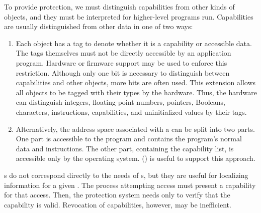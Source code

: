 To provide protection, we must distinguish capabilities from other kinds of objects, and they must be interpreted for higher-level programs run.
Capabilities are usually distinguished from other data in one of two ways:
\begin{enumerate}[noitemsep]
\item Each object has a tag to denote whether it is a capability or accessible data.
  The tags themselves must not be directly accessible by an application program.
  Hardware or firmware support may be used to enforce this restriction.
  Although only one bit is necessary to distinguish between capabilities and other objects, more bits are often used.
  This extension allows all objects to be tagged with their types by the hardware.
  Thus, the hardware can distinguish integers, floating-point numbers, pointers, Booleans, characters, instructions, capabilities, and uninitialized values by their tags.
\item Alternatively, the address space associated with a  can be split into two parts.
  One part is accessible to the program and contains the program’s normal data and instructions.
  The other part, containing the capability list, is accessible only by the operating system.
   () is useful to support this approach.
\end{enumerate}

s do not correspond directly to the needs of s, but they are useful for localizing information for a given .
The process attempting access must present a capability for that access.
Then, the protection system needs only to verify that the capability is valid.
Revocation of capabilities, however, may be inefficient.


